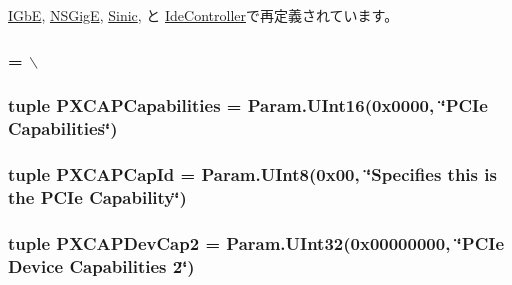 \hyperlink{classEthernet_1_1IGbE_aa63e82532e33e89795f472cfb7e0bb67}{IGbE}, \hyperlink{classEthernet_1_1NSGigE_aa63e82532e33e89795f472cfb7e0bb67}{NSGigE}, \hyperlink{classEthernet_1_1Sinic_aa63e82532e33e89795f472cfb7e0bb67}{Sinic}, と \hyperlink{classIde_1_1IdeController_aa63e82532e33e89795f472cfb7e0bb67}{IdeController}で再定義されています。\hypertarget{classPci_1_1PciDevice_ad2caae7371e91cd9f9fe16993eb175f0}{
\subsubsection[{PXCAPBaseOffset}]{ = $\backslash$}}
\label{classPci_1_1PciDevice_ad2caae7371e91cd9f9fe16993eb175f0}
\hypertarget{classPci_1_1PciDevice_ad4b26ade9d111a52e61b337b836a79b7}{
\subsubsection[{PXCAPCapabilities}]{\setlength{\rightskip}{0pt plus 5cm}tuple {\bf PXCAPCapabilities} = Param.UInt16(0x0000, \char`\"{}PCIe Capabilities\char`\"{})}}
\label{classPci_1_1PciDevice_ad4b26ade9d111a52e61b337b836a79b7}
\hypertarget{classPci_1_1PciDevice_a11b2b5c70013fdbd6ec8579a3c766e8a}{
\subsubsection[{PXCAPCapId}]{\setlength{\rightskip}{0pt plus 5cm}tuple {\bf PXCAPCapId} = Param.UInt8(0x00, \char`\"{}Specifies this is the PCIe Capability\char`\"{})}}
\label{classPci_1_1PciDevice_a11b2b5c70013fdbd6ec8579a3c766e8a}
\hypertarget{classPci_1_1PciDevice_a159956e2ad80c6b1983c8a24545058bd}{
\subsubsection[{PXCAPDevCap2}]{\setlength{\rightskip}{0pt plus 5cm}tuple {\bf PXCAPDevCap2} = Param.UInt32(0x00000000, \char`\"{}PCIe Device Capabilities 2\char`\"{})}}
